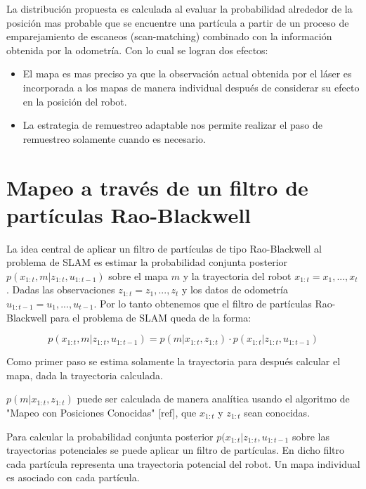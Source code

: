 \documentclass[10pt,a4paper]{article}
\begin{document}
La distribución propuesta es calculada al evaluar la probabilidad alrededor de la posición mas probable que se encuentre una partícula a partir de un proceso de emparejamiento de escaneos (scan-matching) combinado con la información obtenida por la odometría. Con lo cual se logran dos efectos:

\begin{itemize}

\item El mapa es mas preciso ya que la observación actual obtenida por el láser es incorporada a los mapas de manera individual después de considerar su efecto en la posición del robot.
\item La estrategia de remuestreo adaptable nos permite realizar el paso de remuestreo solamente cuando es necesario.

\end{itemize}

\section{Mapeo a través de un filtro de partículas Rao-Blackwell}

La idea central de aplicar un filtro de partículas de tipo Rao-Blackwell al problema de SLAM es estimar la probabilidad conjunta posterior $ p(x_{1:t},m | z_{1:t},u_{1:t-1}) $ sobre el mapa $ m $ y la trayectoria del robot $ x_{1:t} = x_{1},...,x_{t} $. Dadas las observaciones $ z_{1:t} = z_{1},...,z_{t} $ y los datos de odometría $ u_{1:t-1} = u_{1},...,u_{t-1} $. Por lo tanto obtenemos que el filtro de partículas Rao-Blackwell para el problema de SLAM queda de la forma:

\begin{equation}
	p(x_{1:t},m | z_{1:t},u_{1:t-1}) = 
		p(m | x_{1:t}, z_{1:t}) \cdot p(x_{1:t} | z_{1:t},u_{1:t-1})
\end{equation}

Como primer paso se estima solamente la trayectoria para después calcular el mapa, dada la trayectoria calculada.

$ p(m | x_{1:t}, z_{1:t}) $ puede ser calculada de manera analítica usando el algoritmo de "Mapeo con Posiciones Conocidas" [ref], que $ x_{1:t} $ y $ z_{1:t} $ sean conocidas.

Para calcular la probabilidad conjunta posterior $ p(x_{1:t} | z_{1:t},u_{1:t-1} $ sobre las trayectorias potenciales se puede aplicar un filtro de partículas. En dicho filtro cada partícula representa una trayectoria potencial del robot. Un mapa individual es asociado con cada partícula.
\end{document}
